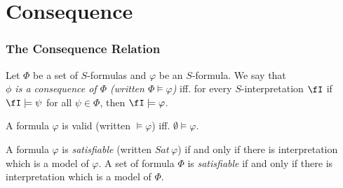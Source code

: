 \section{Consequence}

\begin{frame}
    \frametitle{The Consequence Relation}

    \begin{definition}
        Let $\Phi$ be a set of $S$-formulas and $\varphi$ be an $S$-formula. We say that \\
        \emph{$\phi$ is a consequence of $\Phi$ (written $\Phi \models \varphi$)} iff. for every $S$-interpretation $\fI$ if $\fI \models \psi$ for all $\psi \in \Phi$, then $\fI \models \varphi$.
    \end{definition}

    \begin{definition}
        A formula $\varphi$ is valid (written $\models \varphi$) iff. $\emptyset \models \varphi$.
    \end{definition}

    \begin{definition}
        A formula $\varphi$ is \emph{satisfiable} (written $\textit{Sat} \, \varphi$) if and only if there is interpretation which is a model of $\varphi$.
        A set of formula $\Phi$ is \emph{satisfiable} if and only if there is interpretation which is a model of $\Phi$.
    \end{definition}

\end{frame}
